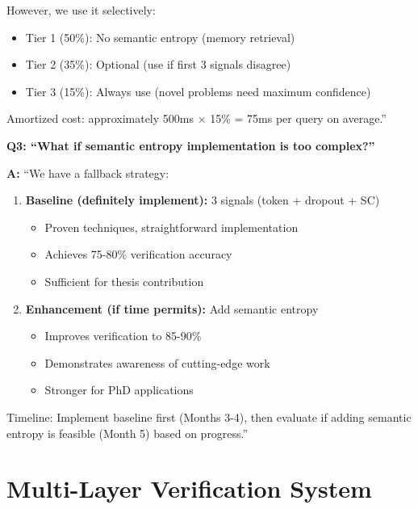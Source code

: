 \documentclass[12pt,a4paper]{article}
\theoremstyle{definition}
\begin{document}
\begin{defensebox}
However, we use it selectively:
\begin{itemize}
    \item Tier 1 (50\%): No semantic entropy (memory retrieval)
    \item Tier 2 (35\%): Optional (use if first 3 signals disagree)
    \item Tier 3 (15\%): Always use (novel problems need maximum confidence)
\end{itemize}

Amortized cost: approximately 500ms $\times$ 15\% = 75ms per query on average.''

\textbf{Q3: ``What if semantic entropy implementation is too complex?''}

\textbf{A:} ``We have a fallback strategy:
\begin{enumerate}
    \item \textbf{Baseline (definitely implement):} 3 signals (token + dropout + SC)
    \begin{itemize}
        \item Proven techniques, straightforward implementation
        \item Achieves 75-80\% verification accuracy
        \item Sufficient for thesis contribution
    \end{itemize}
    
    \item \textbf{Enhancement (if time permits):} Add semantic entropy
    \begin{itemize}
        \item Improves verification to 85-90\%
        \item Demonstrates awareness of cutting-edge work
        \item Stronger for PhD applications
    \end{itemize}
\end{enumerate}

Timeline: Implement baseline first (Months 3-4), then evaluate if adding semantic entropy is feasible (Month 5) based on progress.''
\end{defensebox}

\newpage

\section{Multi-Layer Verification System}
\end{document}
